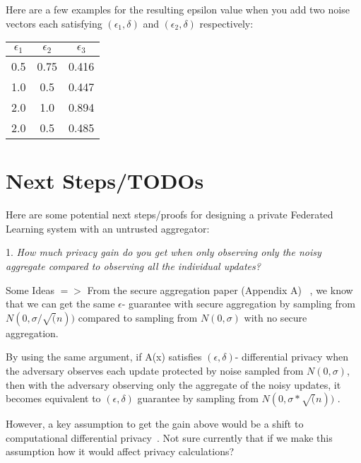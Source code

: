 \documentclass{article}
\theoremstyle{remark}
\theoremstyle{definition}
\begin{document}
Here are a few examples for the resulting epsilon value  when you add two noise vectors each satisfying $(\epsilon_{1},\delta)$ and $(\epsilon_{2},\delta)$ respectively:

	\begin{center}
	 \begin{tabular}{||c c c||} 
	 \hline
	 $\epsilon_{1}$ & $\epsilon_{2}$ & $\epsilon_{3}$ \\  
	 \hline\hline
	 0.5 & 0.75 & 0.416 \\
	 \hline
	 1.0 & 0.5 & 0.447 \\
	 \hline
	 2.0 & 1.0 & 0.894 \\
	 \hline
	 2.0 & 0.5 & 0.485 \\
	\end{tabular}
	\end{center}


\section{Next Steps/TODOs}

Here are some potential next steps/proofs for designing a private Federated Learning system with an untrusted aggregator:

 
1. \emph{How much privacy gain do you get when only observing only the noisy aggregate compared to observing all the individual updates?}

	Some Ideas $=>$ From the secure aggregation paper (Appendix A) ~\cite{Bonawitz:2017}, we know that we can get the same $\epsilon$- guarantee with secure aggregation by sampling from $N(0,\sigma/\sqrt(n))$ compared to sampling from $N(0,\sigma)$ with no secure aggregation.

	By using the same argument, if A(x) satisfies $(\epsilon,\delta)$- differential privacy when the adversary observes each update  protected by noise sampled from $N(0, \sigma)$, then with the adversary observing only the aggregate of the noisy updates, it becomes equivalent to $(\epsilon,\delta)$ guarantee by sampling from $N(0, \sigma*\sqrt(n))$ . 

	However, a key assumption to get the gain above would be a shift to computational differential privacy~\cite{Mironov:2009}. Not sure currently that if we make this assumption how it would affect privacy calculations? 
\end{document}
